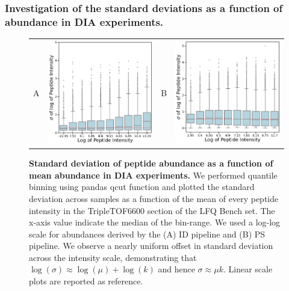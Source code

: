 \documentclass[11pt]{article}
\begin{document}
\subsubsection*{Investigation of the standard deviations as a function of abundance in DIA experiments.}
\begin{figure}[hbt]
    \centering
    \centering
    \begin{tabular}{lclc} 
        A & \includegraphics[width=0.5\linewidth]{../../result/report_plots_pipeline/quantile_bins_ID_median.png} &
        B & \includegraphics[width=0.5\linewidth]{../../result/report_plots_pipeline/quantile_bins_PS_median.png} \\
    \end{tabular}
  \caption{{\bf Standard deviation of peptide abundance as a function of mean abundance in DIA experiments.} We performed quantile binning using pandas qcut function and plotted the standard deviation across samples as a function of the mean of every peptide intensity in the TripleTOF6600 section of the LFQ Bench set. The x-axis value indicate the median of the bin-range. We used a log-log scale for abundances derived by the (A) ID pipeline and (B) PS pipeline.  We observe a nearly uniform offset in standard deviation across the intensity scale, demonstrating that $\log(\sigma) \approx \log(\mu) + \log(k)$ and hence   $\sigma \approx \mu k$. Linear scale plots are reported as reference.  \label{fig:uniform_offset_in_standard_deviation_boxplot}}
\end{figure}
\end{document}
